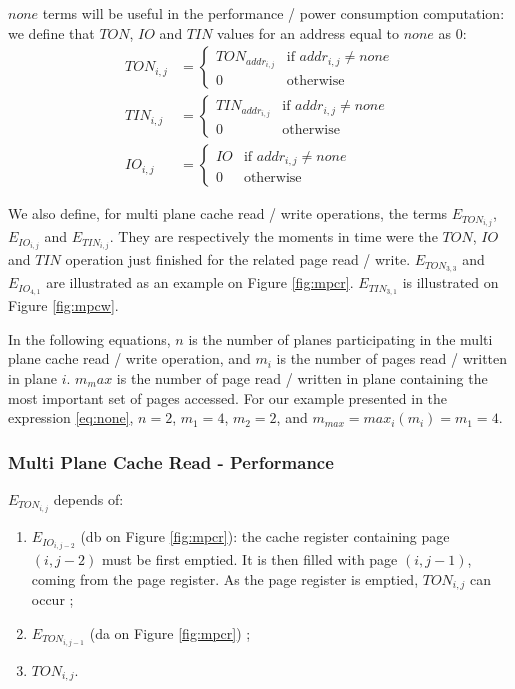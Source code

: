 \documentclass[oneside]{memoir}
\begin{document}
$none$ terms will be useful in the performance / power consumption computation: we define that $TON$, $IO$ and $TIN$ values for an address equal to $none$ as $0$:
\begin{align}
TON_{i,j} & =
\begin{cases}
      TON_{addr_{i,j}} & \text{if } addr_{i,j} \ne none\\
      0 & \text{otherwise}
\end{cases}\\
TIN_{i,j} & =
\begin{cases}
      TIN_{addr_{i,j}} & \text{if } addr_{i,j} \ne none\\
      0 & \text{otherwise}
\end{cases}\\
IO_{i,j} & = 
\begin{cases}
      IO & \text{if } addr_{i,j} \ne none\\
      0 & \text{otherwise}
\end{cases}
\end{align}

We also define, for multi plane cache read / write operations, the terms $E_{TON_{i,j}}$, $E_{IO_{i,j}}$ and $E_{TIN_{i,j}}$. They are respectively the moments in time were the $TON$, $IO$ and $TIN$ operation just finished for the related page read / write. $E_{TON_{3,3}}$ and $E_{IO_{4,1}}$ are illustrated as an example on Figure \ref{fig:mpcr}. $E_{TIN_{3,1}}$ is illustrated on Figure \ref{fig:mpcw}.

In the following equations, $n$ is the number of planes participating in the multi plane cache read / write operation, and $m_i$ is the number of pages read / written in plane $i$. $m_max$ is the number of page read / written in plane containing the most important set of pages accessed. For our example presented in the expression \ref{eq:none}, $n=2$, $m_1=4$, $m_2=2$, and $m_{max}=max_i(m_i)=m_1=4$.

\subsubsection{Multi Plane Cache Read - Performance}

\noindent $E_{TON_{i,j}}$ depends of:

\begin{enumerate}
  \item $E_{IO_{i,j-2}}$ (db on Figure \ref{fig:mpcr}): the cache register containing page $(i,j-2)$ must be first emptied. It is then filled with page $(i,j-1)$, coming from the page register. As the page register is emptied, $TON_{i,j}$ can occur ;
  \item $E_{TON_{i,j-1}}$ (da on Figure \ref{fig:mpcr}) ;
  \item $TON_{i,j}$.
\end{enumerate}
\end{document}
